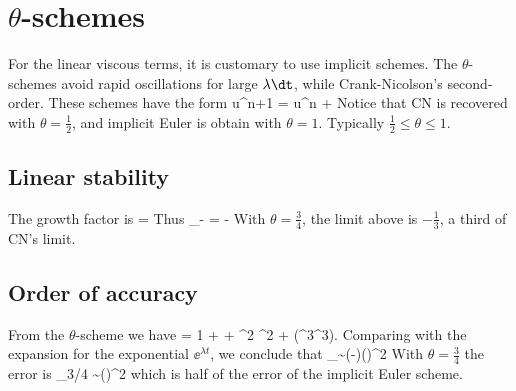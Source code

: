 \documentclass[11pt]{article}
\begin{document}

\section{$\theta$-schemes}
For the linear viscous terms, it is customary to use implicit schemes. The $\theta$-schemes avoid rapid oscillations for large $\lambda \dt$, while Crank-Nicolson's second-order. These schemes have the form
\beq
\label{eq:th_schemes}
u^{n+1} = u^n + \per
\eeq
Notice that CN  is recovered with $\theta = \tfrac{1}{2}$, and implicit Euler is obtain with $\theta = 1$. Typically $\tfrac{1}{2}\leq\theta\leq 1$. 

\subsection*{Linear stability}
The growth factor is
\beq
\label{eq:lin_stab_th}
\sigma =  \per
\eeq
Thus
\beq
\lim_{\lambda\dt\to-\infty} \sigma = -  \per
\eeq
With $\theta = \tfrac{3}{4}$, the limit above is $-\tfrac{1}{3}$, a third of CN's limit. 

\subsection*{Order of accuracy}
From the $\theta$-scheme we have
\beq
{} = 1 + \lambda\dt + \theta \lambda^2 \dt^2 + (\lambda^3\dt^3).
\eeq
Comparing with the expansion for the exponential $\ee^{\lambda t}$, we conclude that
\beq
{}_\theta \sim \left(-\theta\right)(\lambda \dt)^2\per 
\eeq
With $\theta = \tfrac{3}{4}$ the error is
\beq
{}_{3/4} \sim {}(\lambda \dt)^2\com
\eeq
which is half of the error of the implicit Euler scheme.
\end{document}
